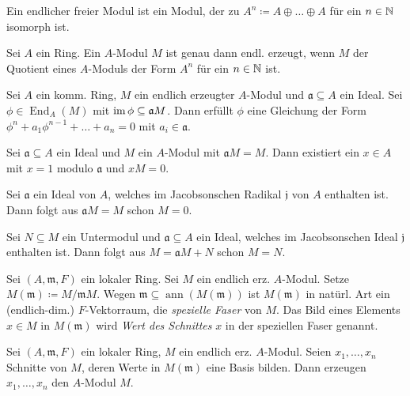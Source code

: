 \documentclass{cheat-sheet}
\DeclareMathOperator{\ann}{ann} %
\DeclareMathOperator{\End}{End} %
\newcommand{\aaa}{\mathfrak{a}}
\newcommand{\jjj}{\mathfrak{j}}
\newcommand{\mmm}{\mathfrak{m}}
\begin{document}
\begin{bem}
  Ein endlicher freier Modul ist ein Modul, der zu $A^n \coloneqq A \oplus \ldots \oplus A$ für ein $n \in \mathbb{N}$ isomorph ist.
\end{bem}

\begin{prop}
  Sei $A$ ein Ring. Ein $A$-Modul $M$ ist genau dann endl. erzeugt, wenn $M$ der Quotient eines $A$-Moduls der Form $A^n$ für ein $n \in \mathbb{N}$ ist.
\end{prop}


\begin{prop}
  Sei $A$ ein komm. Ring, $M$ ein endlich erzeugter $A$-Modul und $\aaa \subseteq A$ ein Ideal.
  Sei $\phi \in \End_A(M)$ mit $\im \phi \subseteq \aaa M$.
  Dann erfüllt $\phi$ eine Gleichung der Form $\phi^n + a_1 \phi^{n-1} + \ldots + a_n = 0$ mit $a_i \in \aaa$.
\end{prop}

\begin{kor}
  Sei $\aaa \subseteq A$ ein Ideal und $M$ ein $A$-Modul mit $\aaa M = M$.
  Dann existiert ein $x \in A$ mit $x = 1$ modulo $\aaa$ und $x M = 0$.
\end{kor}

\begin{lem}
  Sei $\aaa$ ein Ideal von $A$, welches im Jacobsonschen Radikal $\jjj$ von $A$ enthalten ist.
  Dann folgt aus $\aaa M = M$ schon $M = 0$.
\end{lem}

\begin{kor}
  Sei $N \subseteq M$ ein Untermodul und $\aaa \subseteq A$ ein Ideal, welches im Jacobsonschen Ideal $\jjj$ enthalten ist.
  Dann folgt aus $M = \aaa M + N$ schon $M = N$.
\end{kor}

\begin{defn}
  Sei $(A, \mmm, F)$ ein lokaler Ring.
  Sei $M$ ein endlich erz. $A$-Modul.
  Setze $M(\mmm) \coloneqq M/\mmm M$.
  Wegen $\mmm \subseteq \ann(M(\mmm))$ ist $M(\mmm)$ in natürl. Art ein (endlich-dim.) $F$-Vektorraum, die \emph{spezielle Faser} von $M$.
  Das Bild eines Elements $x \in M$ in $M(\mmm)$ wird \emph{Wert des Schnittes} $x$ in der speziellen Faser genannt.
\end{defn}

\begin{prop}
  Sei $(A, \mmm, F)$ ein lokaler Ring, $M$ ein endlich erz. $A$-Modul.
  Seien $x_1, \ldots, x_n$ Schnitte von $M$, deren Werte in $M(\mmm)$ eine Basis bilden.
  Dann erzeugen $x_1, \ldots, x_n$ den $A$-Modul $M$.
\end{prop}
\end{document}
